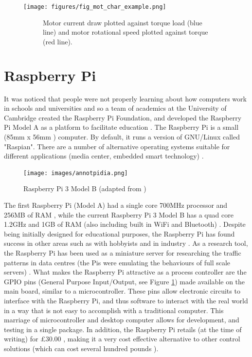 \documentclass[twoside,a4]{report}
\def\br{\newline \newline \noindent}
\begin{document}
	\begin{figure}[!htb]
		\centering
		\texttt{[image: figures/fig\_mot\_char\_example.png]}
		\caption{Example DC Motor Characteristic Curve (adapted from \cite{dvdmotordat})}
		\label{figmotcharexample}
		\begin{subfigure}{0.9\textwidth}
			\footnotesize Motor current draw plotted against torque load (blue line) and motor rotational speed plotted against torque (red line).
		\end{subfigure}
	\end{figure}
	
	\section*{Raspberry Pi}
	It was noticed that people were not properly learning about how computers work in schools and universities and so a team of academics at the University of Cambridge created the Raspberry Pi Foundation, and developed the Raspberry Pi Model A as a platform to facilitate education \cite{pihistory}. The Raspberry Pi is a small (85mm x 56mm \cite{pi3mechdraw}) computer. By default, it runs a version of GNU/Linux called "Raspian". There are a number of alternative operating systems suitable for different applications (media center, embedded smart technology) \cite{piotheros}.  \newline
	\begin{figure}[!htb]
		\centering
		\texttt{[image: images/annotpidia.png]} %
		\caption{Raspberry Pi 3 Model B (adapted from  \cite{pi3info})}
		\label{pidia}
	\end{figure} 
	\newline
	\noindent
	The first Raspberry Pi (Model A) had a single core 700MHz processor and 256MB of RAM \cite{pi1info}, while the current Raspberry Pi 3 Model B has a quad core 1.2GHz and 1GB of RAM (also including built in WiFi and Bluetooth) \cite{pi3info}. 
	\br
	Despite being initially designed for educational purposes, the Raspberry Pi has found success in other areas such as with hobbyists \cite{pihobbynotedu} and in industry \cite{pimorethanedu}. As a research tool, the Raspberry Pi has been used as a miniature server for researching the traffic patterns in data centres (the Pis were emulating the behaviours of full scale servers) \cite{piglasgowdc}.
	\br
	What makes the Raspberry Pi attractive as a process controller are the GPIO pins (General Purpose Input/Output, see Figure \ref{pidia}) made available on the main board, similar to a microcontroller. These pins allow electronic circuits to interface with the Raspberry Pi, and thus software to interact with the real world in a way that is not easy to accomplish with a traditional computer. This marriage of microcontroller and desktop computer allows for development, and testing in a single package. In addition, the Raspberry Pi retails (at the time of writing) for \pounds 30.00 \cite{picost}, making it a very cost effective alternative to other control solutions (which can cost several hundred pounds \cite{otherpcucost}). 
\end{document}
